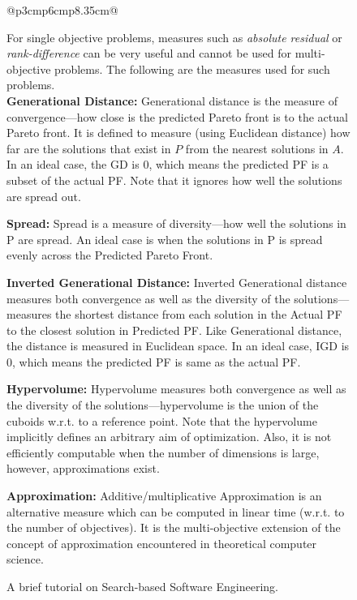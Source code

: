 \documentclass[sigconf]{acmart}
\begin{document}
\begin{figure}
{\begin{tabular}{@{}p{3cm}p{6cm}p{8.35cm}@{}}
{\begin{minipage}[b]{0.33\linewidth}
                                \vspace{0.5cm}
                        \end{minipage}
                        \begin{minipage}[b]{0.67\linewidth}
                            \vspace{0.1cm}
                            For single objective problems, measures such as \textit{absolute residual} or \textit{rank-difference} can be very useful and cannot be used for multi-objective problems. The following are the measures used for such problems.\\
                            \textbf{Generational Distance: } Generational distance is the measure of convergence---how close is the predicted Pareto front is to the actual Pareto front. It is defined to measure (using Euclidean distance) how far are the solutions that exist in $P$ from the nearest solutions in $A$. In an ideal case, the GD is 0, which means the predicted PF is a subset of the actual PF. Note that it ignores how well the solutions are spread out.
                            
                            \textbf{Spread: } Spread is a measure of diversity---how well the solutions in P are spread. An ideal case is when the solutions in P is spread evenly across the Predicted Pareto Front. 
                            
                            \textbf{Inverted Generational Distance: } Inverted Generational distance measures both convergence as well as the diversity of the solutions---measures the shortest distance from each solution in the Actual PF to the closest solution in Predicted PF. Like Generational distance, the distance is measured in Euclidean space. In an ideal case, IGD is 0, which means the predicted PF is same as the actual PF.
                            
                            \textbf{Hypervolume: } Hypervolume measures both convergence as well as the diversity of the solutions---hypervolume is the union of the cuboids w.r.t. to a reference point. Note that the hypervolume implicitly defines an arbitrary aim of optimization. Also, it is not efficiently computable when the number of dimensions is large, however, approximations exist.
                            
                            \textbf{Approximation: } Additive/multiplicative Approximation is an alternative measure which can be computed in linear time (w.r.t. to the number of objectives). It is the multi-objective extension of the concept of approximation encountered in theoretical computer science. 
                          
                    
                        \end{minipage}    
                }
            \end{tabular}
        }
        \caption{A {brief} tutorial on Search-based Software Engineering.}
        \label{fig:sbse_crash}
\end{figure}
\end{document}

